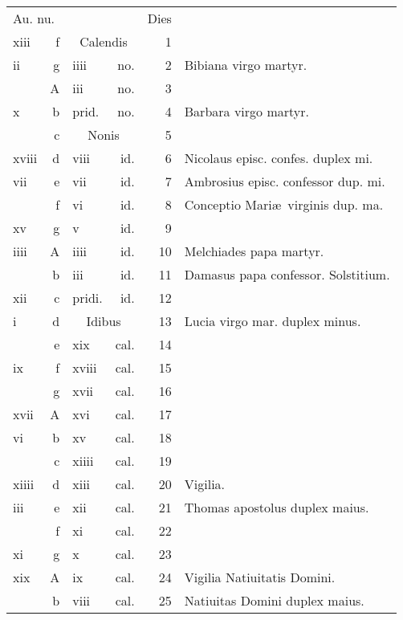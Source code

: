 \documentclass[a5paper,10pt]{book}
\begin{document}
\begin{center}
\begin{tabular}{l r l r r l}
\multicolumn{2}{l}{\color{red}Au. nu.} & & & \color{red} Dies & \\
xiii & f & \multicolumn{2}{c}{\color{red} Calendis} & 1 & \\
ii & g & iiii & no. & 2 & Bibiana virgo martyr. \\
 & \color{red} A & iii & no. & 3 & \\
x & b & \color{red} prid. & no. & 4 & Barbara virgo martyr. \color{black}\\
 & c & \multicolumn{2}{c}{\color{red} Nonis} & 5 & \\
xviii & d & viii & id. & 6 & \color{red} Nicolaus episc. confes. duplex mi. \color{black} \\
vii & e & vii & id. & 7 & Ambrosius episc. confessor dup. mi. \color{black} \\
 & f & vi & id. & 8 & \color{red} Conceptio Mari\ae \ virginis dup. ma. \color{black} \\
xv & g & v & id. & 9 & \\
iiii & \color{red} A & iiii & id. & 10 & Melchiades papa martyr. \\
 & b & iii & id. & 11 & Damasus papa confessor. Solstitium. \\%
xii & c & \color{red} pridi. & id. & 12 & \\
i & d & \multicolumn{2}{c}{\color{red} Idibus} & 13 & Lucia virgo mar. duplex minus. \\
 & e & xix & cal. & 14 & \\
ix & f & xviii & cal. & 15 & \\
 & g & xvii & cal. & 16 & \\
xvii & \color{red} A & xvi & cal. & 17 & \\
vi & b & xv & cal. & 18 & \\
 & c & xiiii & cal. & 19 & \\
xiiii & d & xiii & cal. & 20 & \qquad \qquad \qquad \color{red} Vigilia.\\
iii & e & xii & cal. & 21 & \color{red} Thomas apostolus duplex maius. \color{black} \\
 & f & xi & cal. & 22 & \\
xi & g & x & cal. & 23 & \\
xix & \color{red} A & ix & cal. & 24 & \qquad \quad \color{red} Vigilia Natiuitatis Domini. \color{black} \\
 & b & viii & cal. & 25 & \color{red} Natiuitas Domini duplex maius. \color{black} \\

\end{tabular}
\end{center}
\end{document}

